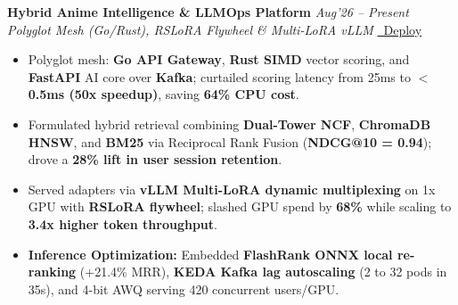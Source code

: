 \documentclass[10pt,a4paper]{article}
\begin{document}
\begin{minipage}[t]{0.488\textwidth}
    \vspace{0.8pt}\vspace{1.2pt}
    \noindent\textbf{Hybrid Anime Intelligence \& LLMOps Platform} \hfill {\footnotesize\textit{Aug'26 -- Present}}\\
    \textit{Polyglot Mesh (Go/Rust), RSLoRA Flywheel \& Multi-LoRA vLLM} \href{https://github.com/KishorKumarParoi/Hybrid-Anime-Recommender}{\faGithub} \href{https://raw.githubusercontent.com/KishorKumarParoi/Hybrid-Anime-Recommender/main/bootstrap.sh}{\faRocket\ Deploy}
    \begin{itemize}
        \item Polyglot mesh: \textbf{Go API Gateway}, \textbf{Rust SIMD} vector scoring, and \textbf{FastAPI} AI core over \textbf{Kafka}; curtailed scoring latency from 25ms to \textbf{$<$0.5ms (50x speedup)}, saving \textbf{64\% CPU cost}.
        \item Formulated hybrid retrieval combining \textbf{Dual-Tower NCF}, \textbf{ChromaDB HNSW}, and \textbf{BM25} via Reciprocal Rank Fusion (\textbf{NDCG@10 = 0.94}); drove a \textbf{28\% lift in user session retention}.
        \item Served adapters via \textbf{vLLM Multi-LoRA dynamic multiplexing} on 1x GPU with \textbf{RSLoRA flywheel}; slashed GPU spend by \textbf{68\%} while scaling to \textbf{3.4x higher token throughput}.
        \item \textbf{Inference Optimization:} Embedded \textbf{FlashRank ONNX local re-ranking} (+21.4\% MRR), \textbf{KEDA Kafka lag autoscaling} (2 to 32 pods in 35s), and 4-bit AWQ serving 420 concurrent users/GPU.
    \end{itemize}


\end{minipage}
\end{document}
